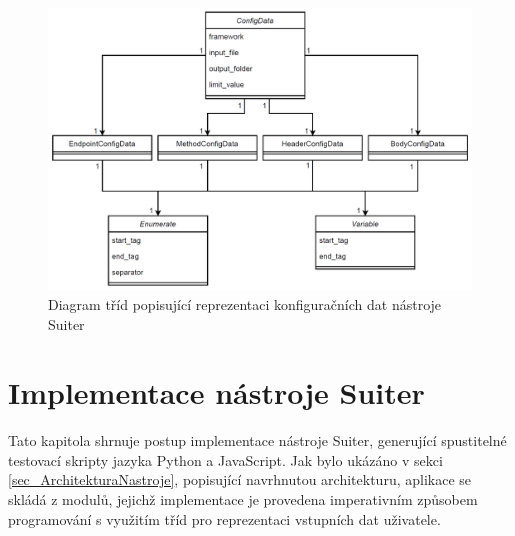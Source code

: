 \begin{figure}[hbt]
	\centering
	\includegraphics[width=1\textwidth]{obrazky-figures/testClassDiagram3.png}
	\caption{Diagram tříd popisující reprezentaci konfiguračních dat nástroje Suiter}
	\label{fig_DiagramTridConfig}
\end{figure}







\chapter{Implementace nástroje Suiter} 
\label{ch_ImplementaceSuiter}

Tato kapitola shrnuje postup implementace nástroje Suiter, generující spustitelné testovací skripty jazyka Python a JavaScript. Jak bylo ukázáno v sekci \ref{sec_ArchitekturaNastroje}, popisující navrhnutou architekturu, aplikace se skládá z modulů, jejichž implementace je provedena imperativním způsobem programování s využitím tříd pro reprezentaci vstupních dat uživatele.

